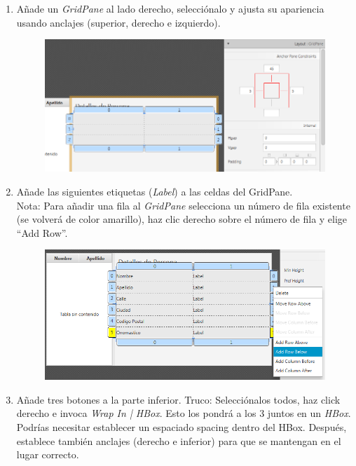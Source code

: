 \begin{enumerate}
\begin{figure}[H]
	\end{figure}
	\item Añade un \textit{GridPane} al lado derecho, selecciónalo y ajusta su apariencia usando anclajes (superior, derecho e izquierdo).
	\begin{figure}[H]
		\includegraphics[width=16cm]{img/gridPane}
	\end{figure}
	\item Añade las siguientes etiquetas (\textit{Label}) a las celdas del GridPane.\\
	Nota: Para añadir una fila al \textit{GridPane} selecciona un número de fila existente (se volverá de color amarillo), haz clic derecho sobre el número de fila y elige “Add Row”.
	\begin{figure}[H]
		\includegraphics[width=14cm]{img/gridPaneAddRow}
	\end{figure}
	\item Añade tres botones a la parte inferior. Truco: Selecciónalos todos, haz click derecho e invoca \textit{Wrap In | HBox}. Esto los pondrá a los 3 juntos en un \textit{HBox}. Podrías necesitar establecer un espaciado spacing dentro del HBox. Después, establece también anclajes (derecho e inferior) para que se mantengan en el lugar correcto.
	\begin{figure}[H]

\end{figure}
\end{enumerate}
